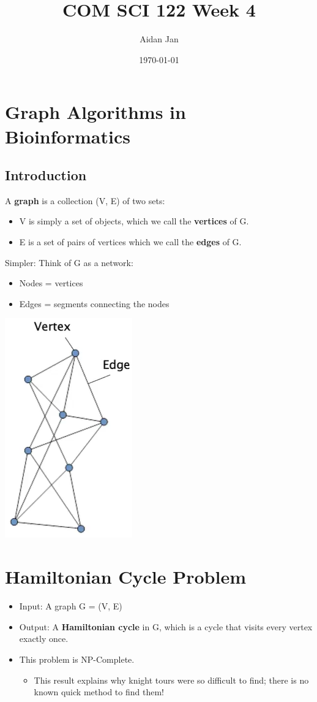 \documentclass[10pt]{article}
\title{COM SCI 122 Week 4}
\author{Aidan Jan}
\date{\today}
\begin{document}
\maketitle

\section*{Graph Algorithms in Bioinformatics}
\subsection*{Introduction}
A \textbf{graph} is a collection (V, E) of two sets:
\begin{itemize}
    \item V is simply a set of objects, which we call the \textbf{vertices} of G.
    \item E is a set of pairs of vertices which we call the \textbf{edges} of G.
\end{itemize}
Simpler: Think of G as a network:
\begin{itemize}
    \item Nodes = vertices
    \item Edges = segments connecting the nodes
\end{itemize}
\begin{center}
    \includegraphics*[scale=0.8]{W4_1.png}
\end{center}

\section*{Hamiltonian Cycle Problem}
\begin{itemize}
    \item Input: A graph G = (V, E)
    \item Output: A \textbf{Hamiltonian cycle} in G, which is a cycle that visits every vertex exactly once.
    \item This problem is NP-Complete.
    \begin{itemize}
        \item This result explains why knight tours were so difficult to find; there is no known quick method to find them!
    \end{itemize}
\end{itemize}
\end{document}
